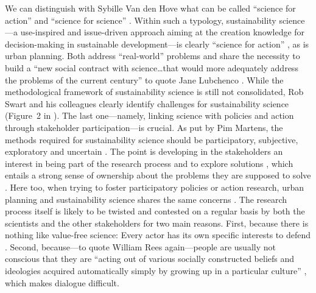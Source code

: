 \documentclass[10pt,a4paper]{article}
\begin{document}
\begin{multicols}{2}
We can distinguish with Sybille Van den Hove what can be called ``science for action'' and ``science for science'' \citep{r29}. Within such a typology, sustainability science---a use-inspired and issue-driven approach aiming at the creation knowledge for decision-making in sustainable development---is clearly ``science for action'' \citep{r30}, as is urban planning. Both address ``real-world'' problems and share the necessity to build a ``new social contract with science\ldots that would more adequately address the problems of the current century'' to quote Jane Lubchenco \citep{r31}. While the methodological framework of sustainability science is still not consolidated, Rob Swart and his colleagues clearly identify challenges for sustainability science (\mbox{Figure 2} in \citep{r32}). The last one---namely, linking science with policies and action through stakeholder participation---is crucial. As put by Pim Martens, the methods required for sustainability science should be participatory, subjective, exploratory and uncertain \citep{r33}. The point is developing in the stakeholders an interest in being part of the research process and to explore solutions \citep{r34, r35}, which entails a strong sense of ownership about the problems they are supposed to solve \citep{r36, r37}. Here too, when trying to foster participatory policies or action research, urban planning and sustainability science shares the same concerns \citep{r38}. The research process itself is likely to be twisted and contested on a regular basis by both the scientists and the other stakeholders for two main reasons. First, because there is nothing like value-free science: Every actor has its own specific interests to defend \citep{r39, r40}. Second, because---to quote William Rees again---people are usually not conscious that they are ``acting out of various socially constructed beliefs and ideologies acquired automatically simply by growing up in a particular culture'' \citep{r41}, which makes dialogue difficult.



\end{multicols}
\end{document}

